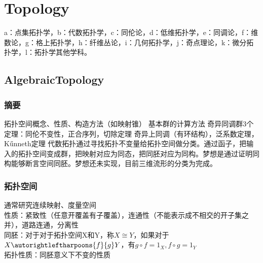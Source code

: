 
\chapter{Topology}


a：点集拓扑学，b：代数拓扑学，c：同伦论，d：低维拓扑学，e：同调论，f：维数论，g：格上拓扑学，h：纤维丛论，i：几何拓扑学，j：奇点理论，k：微分拓扑学，l：拓扑学其他学科。


\section{AlgebraicTopology}
\subsection{摘要}
拓扑空间概念、性质、构造方法（如映射锥）
基本群的计算方法
奇异同调群3个定理：同伦不变性，正合序列，切除定理
奇异上同调（有环结构），泛系数定理，K\H unneth定理
代数拓扑通过寻找拓扑不变量给拓扑空间做分类。通过函子，把输入的拓扑空间变成群，把映射对应为同态，把同胚对应为同构。梦想是通过证明同构能够断言空间同胚。梦想还未实现，目前三维流形的分类为完成。
\subsection{拓扑空间}
通常研究连续映射、度量空间\\
性质：紧致性（任意开覆盖有子覆盖），连通性（不能表示成不相交的开子集之并），道路连通，分离性\\
同胚：对于对于拓扑空间X和Y，称$X\cong Y$，如果对于$ X \autorightleftharpoons{f}{g}Y $，有$ g\circ f =1_X,f\circ g=1_Y $\\
拓扑性质：同胚意义下不变的性质















 
\begin{comment}
    dsa 
    X \autorightleftharpoons{d969696}{3}Y
    \overset{f}{ \underset{g}{\rightleftharpoons} } 
    \xlongequal[d]{dfafdsf}
    \autorightleftharpoons{f}{g} Z

    \begin{equation}
    \label{homeomorphism}
    \begin{split}
        &\text{if: }X \autorightleftharpoons{f}{g}Y\\
        &\text{where: }g\circ f =1_X,f\circ g=1_Y\\
        &\text{then: }X\cong Y\\
    \end{split}
    \end{equation}

\end{comment}

